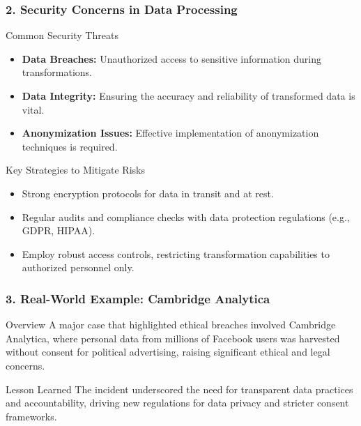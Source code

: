 \documentclass[aspectratio=169]{beamer}
\begin{document}
\begin{frame}[fragile]
    \frametitle{2. Security Concerns in Data Processing}
    \begin{block}{Common Security Threats}
        \begin{itemize}
            \item \textbf{Data Breaches:} Unauthorized access to sensitive information during transformations.
            \item \textbf{Data Integrity:} Ensuring the accuracy and reliability of transformed data is vital.
            \item \textbf{Anonymization Issues:} Effective implementation of anonymization techniques is required.
        \end{itemize}
    \end{block}

    \begin{block}{Key Strategies to Mitigate Risks}
        \begin{itemize}
            \item Strong encryption protocols for data in transit and at rest.
            \item Regular audits and compliance checks with data protection regulations (e.g., GDPR, HIPAA).
            \item Employ robust access controls, restricting transformation capabilities to authorized personnel only.
        \end{itemize}
    \end{block}
\end{frame}

\begin{frame}[fragile]
    \frametitle{3. Real-World Example: Cambridge Analytica}
    \begin{block}{Overview}
        A major case that highlighted ethical breaches involved Cambridge Analytica, where personal data from millions of Facebook users was harvested without consent for political advertising, raising significant ethical and legal concerns.
    \end{block}

    \begin{block}{Lesson Learned}
        The incident underscored the need for transparent data practices and accountability, driving new regulations for data privacy and stricter consent frameworks.
    \end{block}
\end{frame}
\end{document}
